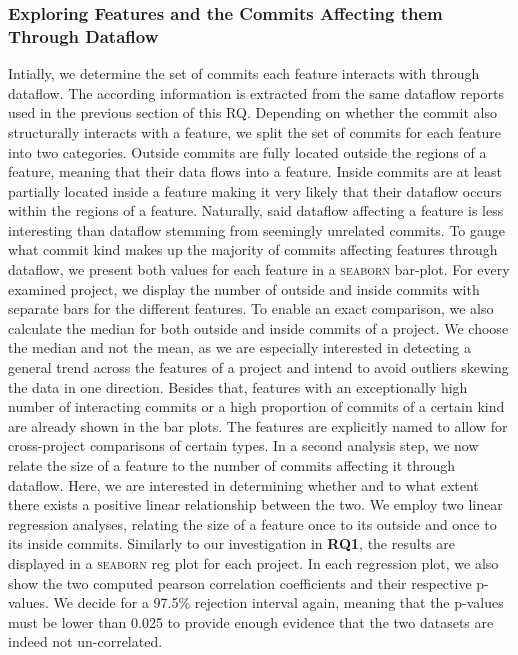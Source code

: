 \subsubsection*{Exploring Features and the Commits Affecting them Through Dataflow}

Intially, we determine the set of commits each feature interacts with through dataflow.
The according information is extracted from the same dataflow reports used in the previous section of this RQ.
Depending on whether the commit also structurally interacts with a feature, we split the set of commits for each feature into two categories.
Outside commits are fully located outside the regions of a feature, meaning that their data flows into a feature.
Inside commits are at least partially located inside a feature making it very likely that their dataflow occurs within the regions of a feature.
Naturally, said dataflow affecting a feature is less interesting than dataflow stemming from seemingly unrelated commits.
To gauge what commit kind makes up the majority of commits affecting features through dataflow, we present both values for each feature in a \textsc{seaborn} bar-plot.
For every examined project, we display the number of outside and inside commits with separate bars for the different features.
To enable an exact comparison, we also calculate the median for both outside and inside commits of a project.
We choose the median and not the mean, as we are especially interested in detecting a general trend across the features of a project and intend to avoid outliers skewing the data in one direction.
Besides that, features with an exceptionally high number of interacting commits or a high proportion of commits of a certain kind are already shown in the bar plots.
The features are explicitly named to allow for cross-project comparisons of certain types.
In a second analysis step, we now relate the size of a feature to the number of commits affecting it through dataflow.
Here, we are interested in determining whether and to what extent there exists a positive linear relationship between the two.
We employ two linear regression analyses, relating the size of a feature once to its outside and once to its inside commits.
Similarly to our investigation in \textbf{RQ1}, the results are displayed in a \textsc{seaborn} reg plot for each project.
In each regression plot, we also show the two computed pearson correlation coefficients and their respective p-values.
We decide for a 97.5\% rejection interval again, meaning that the p-values must be lower than 0.025 to provide enough evidence that the two datasets are indeed not un-correlated.
